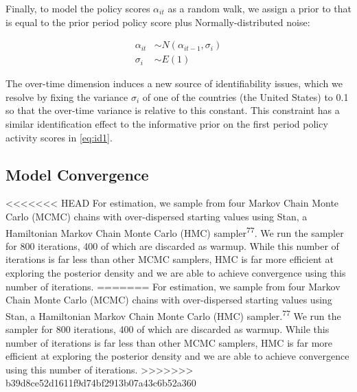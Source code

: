 \documentclass[]{article}
\begin{document}
Finally, to model the policy scores \(\alpha_{it}\) as a random walk, we assign a prior to that is equal to the prior period policy score plus Normally-distributed noise:

\begin{align}
\alpha_{it} &\sim N(\alpha_{it-1},\sigma_i)\\
\sigma_i &\sim E(1)
\label{eq:rwc}
\end{align}

The over-time dimension induces a new source of identifiability issues, which we resolve by fixing the variance \(\sigma_i\) of one of the countries (the United States) to 0.1 so that the over-time variance is relative to this constant. This constraint has a similar identification effect to the informative prior on the first period policy activity scores in \eqref{eq:id1}.

\hypertarget{model-convergence}{%
\subsection*{Model Convergence}\label{model-convergence}}

<<<<<<< HEAD
For estimation, we sample from four Markov Chain Monte Carlo (MCMC) chains with over-dispersed starting values using Stan, a Hamiltonian Markov Chain Monte Carlo (HMC) sampler\textsuperscript{77}. We run the sampler for 800 iterations, 400 of which are discarded as warmup. While this number of iterations is far less than other MCMC samplers, HMC is far more efficient at exploring the posterior density and we are able to achieve convergence using this number of iterations.
=======
For estimation, we sample from four Markov Chain Monte Carlo (MCMC) chains with over-dispersed starting values using Stan, a Hamiltonian Markov Chain Monte Carlo (HMC) sampler.\textsuperscript{77} We run the sampler for 800 iterations, 400 of which are discarded as warmup. While this number of iterations is far less than other MCMC samplers, HMC is far more efficient at exploring the posterior density and we are able to achieve convergence using this number of iterations.
>>>>>>> b39d8ce52d1611f9d74bf2913b07a43c6b52a360
\end{document}
